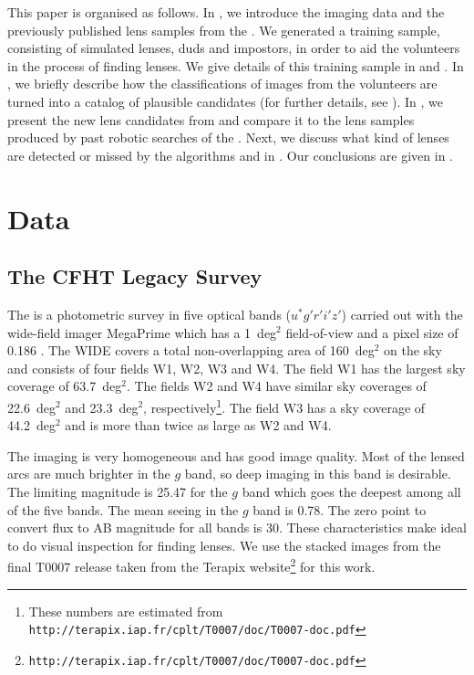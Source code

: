 \documentclass[useAMS,usenatbib,a4paper]{mn2e}
\begin{document}
This paper is organised as follows. In
, we introduce the \cfhtls imaging data and the
previously published lens samples from the \cfhtls. We generated a training sample,
consisting of simulated lenses, duds and impostors, in order to
aid the \sw volunteers in the process of finding lenses. We give details of this
training sample in  and . In ,
we briefly describe how the classifications of images from the volunteers are
turned into a catalog of plausible candidates (for further details, see
\PaperOne). In , we present the new lens candidates from \sw and
compare it to the lens samples produced by past robotic searches of
the \cfhtls. Next, we discuss what kind of lenses are detected
or missed by the algorithms and \sw in .
Our conclusions are given in .



\section{Data}
\label{sec:data}

\subsection{The CFHT Legacy Survey}
\label{sec:data:cfhtls}

The \cfhtls is a photometric survey in five optical bands
($u^*g'r'i'z'$) carried out with the wide-field imager MegaPrime which
has a 1~deg$^2$ field-of-view and a pixel size of 0.186\arcsec
\citep{Gwyn2012}. The \cfhtls WIDE covers a total
non-overlapping area of 160~deg$^2$ on the sky and consists of four
fields W1, W2, W3 and W4. The field W1 has the largest sky coverage of
63.7~deg$^2$. The fields W2 and W4 have similar sky coverages of
22.6~deg$^2$ and 23.3~deg$^2$, respectively\footnote{These numbers are
estimated from
\texttt{http://terapix.iap.fr/cplt/T0007/doc/T0007-doc.pdf}}.  The field
W3 has a sky coverage of 44.2~deg$^2$ and is more than twice as large as
W2 and W4.

The \cfhtls imaging is very homogeneous and has good image quality. Most
of the lensed arcs are much brighter in the $g$ band, so deep imaging
in this band is desirable. The limiting magnitude is 25.47 for the $g$
band which goes the deepest among all of the five bands. The mean seeing
in the $g$ band is 0.78\arcsec. The zero point to convert flux to AB
magnitude for all bands is 30. These characteristics make \cfhtls ideal
to do visual inspection for finding lenses.  We use the stacked images
from the final T0007 release taken from the Terapix
website\footnote{\texttt{http://terapix.iap.fr/cplt/T0007/doc/T0007-doc.pdf}}
for this work.
\end{document}
